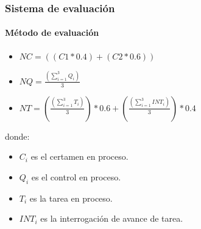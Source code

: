 \documentclass{beamer}
\begin{document}
		\begin{frame}
			\frametitle{Sistema de evaluaci\'on}
			\framesubtitle{M\'etodo de evaluaci\'on}

			\begin{block}{}
				\begin{center}
					\begin{itemize}
  							\item$NC ={\left(\displaystyle(C1 * 0.4) +(C2 * 0.6)\right)}$ \\
							\item$NQ = \frac{\left(\displaystyle\sum_{i=1}^{3}{Q_{i}}\right)}{3}$ \\
  							\item$NT = (\displaystyle\frac{\left(\displaystyle\sum_{i=1}^{3}{T_{i}}\right)}{3})*0.6 +   (\displaystyle\frac{\left(\displaystyle\sum_{i=1}^{3}{INT_{i}}\right)}{3})*0.4$
					\end{itemize}
				\end{center}
donde:
				\begin{itemize}

					\item[] $C_{i}$ es el certamen en proceso.
					\item[] $Q_{i}$ es el control en proceso.
					\item[] $T_{i}$ es la tarea en proceso.
					\item[] $INT_{i}$ es la interrogaci\'on de avance de tarea.
				\end{itemize}
			\end{block}
		\end{frame}
\end{document}
